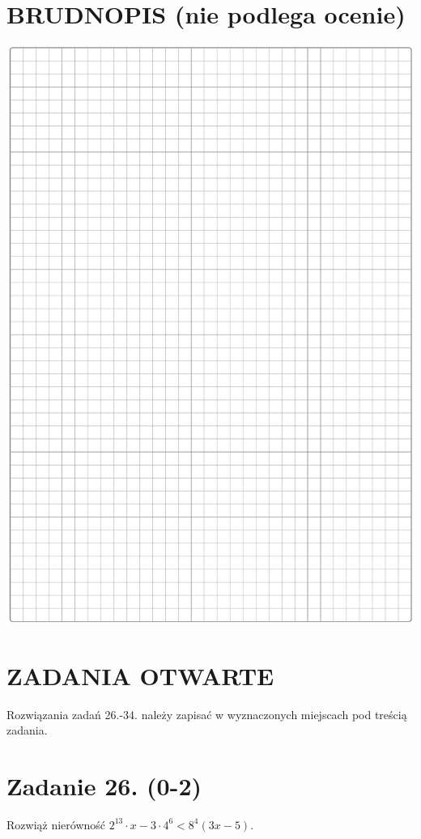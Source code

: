 \documentclass[10pt]{article}
\begin{document}
\section*{BRUDNOPIS (nie podlega ocenie)}
\begin{center}
\includegraphics[max width=\textwidth]{2024_11_21_e15da647cf0a41077ac3g-09}
\end{center}

\section*{ZADANIA OTWARTE}
Rozwiązania zadań 26.-34. należy zapisać w wyznaczonych miejscach pod treścią zadania.

\section*{Zadanie 26. (0-2)}
Rozwiąż nierówność \(2^{13} \cdot x-3 \cdot 4^{6}<8^{4}(3 x-5)\).
\end{document}

